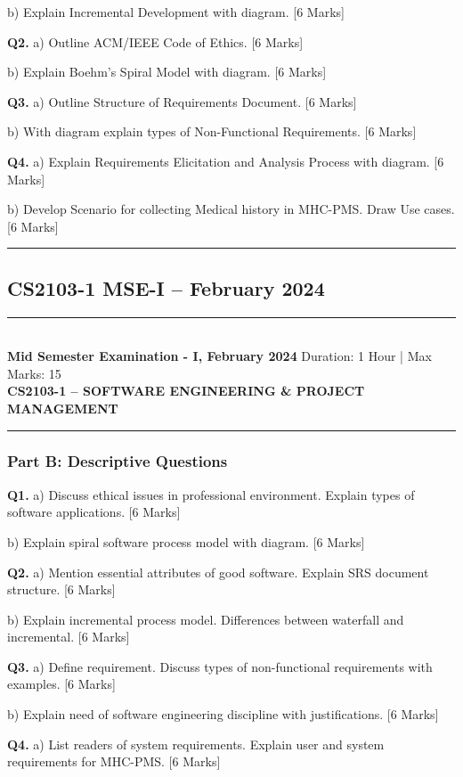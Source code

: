 \documentclass[11pt,a4paper]{article}
\newcommand{\examheader}[4]{
\noindent\rule{\textwidth}{0.5pt}\\
\textbf{#1} \hfill Duration: #3 | Max Marks: #4\\
\textbf{#2}\\
\rule{\textwidth}{0.5pt}
\vspace{0.2cm}
}
\begin{document}
b) Explain Incremental Development with diagram. \hfill [6 Marks]

\textbf{Q2.} a) Outline ACM/IEEE Code of Ethics. \hfill [6 Marks]

b) Explain Boehm's Spiral Model with diagram. \hfill [6 Marks]

\textbf{Q3.} a) Outline Structure of Requirements Document. \hfill [6 Marks]

b) With diagram explain types of Non-Functional Requirements. \hfill [6 Marks]

\textbf{Q4.} a) Explain Requirements Elicitation and Analysis Process with diagram. \hfill [6 Marks]

b) Develop Scenario for collecting Medical history in MHC-PMS. Draw Use cases. \hfill [6 Marks]

\vspace{0.5cm}
\hrule
\vspace{0.5cm}

\subsection{CS2103-1 MSE-I -- February 2024}
\examheader{Mid Semester Examination - I, February 2024}{CS2103-1 -- SOFTWARE ENGINEERING \& PROJECT MANAGEMENT}{1 Hour}{15}

\subsubsection*{Part B: Descriptive Questions}

\textbf{Q1.} a) Discuss ethical issues in professional environment. Explain types of software applications. \hfill [6 Marks]

b) Explain spiral software process model with diagram. \hfill [6 Marks]

\textbf{Q2.} a) Mention essential attributes of good software. Explain SRS document structure. \hfill [6 Marks]

b) Explain incremental process model. Differences between waterfall and incremental. \hfill [6 Marks]

\textbf{Q3.} a) Define requirement. Discuss types of non-functional requirements with examples. \hfill [6 Marks]

b) Explain need of software engineering discipline with justifications. \hfill [6 Marks]

\textbf{Q4.} a) List readers of system requirements. Explain user and system requirements for MHC-PMS. \hfill [6 Marks]
\end{document}
